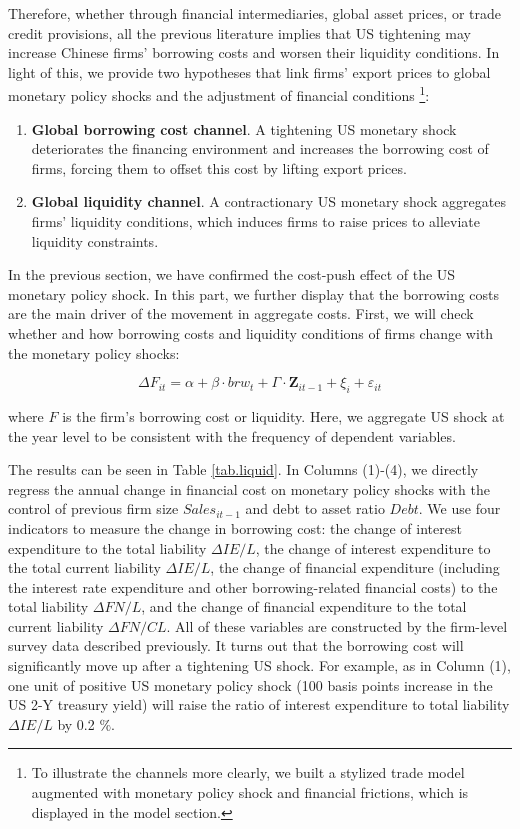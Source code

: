 Therefore, whether through financial intermediaries, global asset prices, or trade credit provisions, all the previous literature implies that US tightening may increase Chinese firms' borrowing costs and worsen their liquidity conditions. In light of this, we provide two hypotheses that link firms' export prices to global monetary policy shocks and the adjustment of financial conditions \footnote{To illustrate the channels more clearly, we built a stylized trade model augmented with monetary policy shock and financial frictions, which is displayed in the model section.}:

\begin{enumerate}
    \item \textbf{Global borrowing cost channel}. A tightening US monetary shock deteriorates the financing environment and increases the borrowing cost of firms, forcing them to offset this cost by lifting export prices.
    \item \textbf{Global liquidity channel}. A contractionary US monetary shock aggregates firms' liquidity conditions, which induces firms to raise prices to alleviate liquidity constraints.
\end{enumerate}

In the previous section, we have confirmed the cost-push effect of the US monetary policy shock. In this part, we further display that the borrowing costs are the main driver of the movement in aggregate costs. First, we will check whether and how borrowing costs and liquidity conditions of firms change with the monetary policy shocks:

\begin{equation}
    \Delta F_{it} = \alpha +\beta \cdot brw_{t}+ \Gamma \cdot \textbf{Z}_{it-1}+\xi_{i}+\varepsilon_{it} \label{reg.liquid}
\end{equation}

where $F$ is the firm's borrowing cost or liquidity. Here, we aggregate US shock at the year level to be consistent with the frequency of dependent variables.

The results can be seen in Table \ref{tab.liquid}. In Columns (1)-(4), we directly regress the annual change in financial cost on monetary policy shocks with the control of previous firm size $Sales_{it-1}$ and debt to asset ratio $Debt$. We use four indicators to measure the change in borrowing cost: the change of interest expenditure to the total liability $\Delta IE/L$, the change of interest expenditure to the total current liability $\Delta IE/L$, the change of financial expenditure (including the interest rate expenditure and other borrowing-related financial costs) to the total liability $\Delta FN/L$, and the change of financial expenditure to the total current liability $\Delta FN/CL$. All of these variables are constructed by the firm-level survey data described previously. It turns out that the borrowing cost will significantly move up after a tightening US shock. For example, as in Column (1), one unit of positive US monetary policy shock (100 basis points increase in the US 2-Y treasury yield) will raise the ratio of interest expenditure to total liability $\Delta IE/L$ by 0.2 $\%$. 

